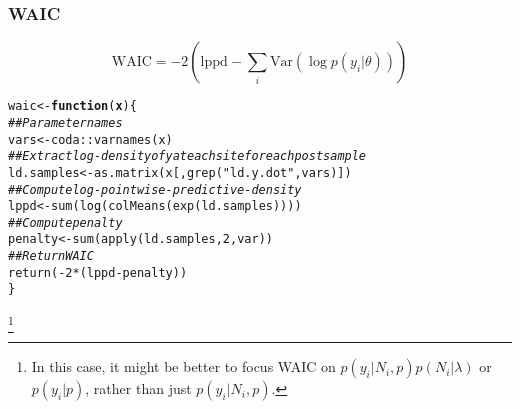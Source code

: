\documentclass[color=usenames,dvipsnames]{beamer}\usepackage[]{graphicx}\usepackage[]{xcolor}
\makeatletter
\newcommand{\hlnum}[1]{\textcolor[rgb]{0.69,0.494,0}{#1}}%
\newcommand{\hlstr}[1]{\textcolor[rgb]{0.749,0.012,0.012}{#1}}%
\newcommand{\hlcom}[1]{\textcolor[rgb]{0.514,0.506,0.514}{\textit{#1}}}%
\newcommand{\hlopt}[1]{\textcolor[rgb]{0,0,0}{#1}}%
\newcommand{\hlstd}[1]{\textcolor[rgb]{0,0,0}{#1}}%
\newcommand{\hlkwa}[1]{\textcolor[rgb]{0,0,0}{\textbf{#1}}}%
\newcommand{\hlkwb}[1]{\textcolor[rgb]{0,0.341,0.682}{#1}}%
\newcommand{\hlkwc}[1]{\textcolor[rgb]{0,0,0}{\textbf{#1}}}%
\newcommand{\hlkwd}[1]{\textcolor[rgb]{0.004,0.004,0.506}{#1}}%
\newenvironment{kframe}{%
 \def\at@end@of@kframe{}%
 \ifinner\ifhmode%
  \def\at@end@of@kframe{\end{minipage}}%
  \begin{minipage}{\columnwidth}%
 \fi\fi%
 \def\FrameCommand##1{\hskip\@totalleftmargin \hskip-\fboxsep
 \colorbox{shadecolor}{##1}\hskip-\fboxsep
     \hskip-\linewidth \hskip-\@totalleftmargin \hskip\columnwidth}%
 \MakeFramed {\advance\hsize-\width
   \@totalleftmargin\z@ \linewidth\hsize
   \@setminipage}}%
 {\par\unskip\endMakeFramed%
 \at@end@of@kframe}
\newenvironment{knitrout}{}{} %
\makeatother
\begin{document}
\bgroup
\let\oldfootnoterule\footnoterule
\def\footnoterule{\only<2->\oldfootnoterule}
\begin{frame}[fragile]
  \frametitle{WAIC}
  \[
    \mathrm{WAIC} = -2\left(\mathrm{lppd} - \sum_i \mathrm{Var}(\log p(y_i|\theta))\right)
  \]

\begin{knitrout}\footnotesize
{}\color{fgcolor}\begin{kframe}
\begin{alltt}
\hlstd{waic} \hlkwb{<-} \hlkwa{function}\hlstd{(}\hlkwc{x}\hlstd{) \{}
    \hlcom{## Parameter names}
    \hlstd{vars} \hlkwb{<-} \hlstd{coda}\hlopt{::}\hlkwd{varnames}\hlstd{(x)}
    \hlcom{## Extract log-density of y at each site for each post sample}
    \hlstd{ld.samples} \hlkwb{<-} \hlkwd{as.matrix}\hlstd{(x[,}\hlkwd{grep}\hlstd{(}\hlstr{"ld.y.dot"}\hlstd{, vars)])}
    \hlcom{## Compute log-pointwise-predictive-density}
    \hlstd{lppd} \hlkwb{<-} \hlkwd{sum}\hlstd{(}\hlkwd{log}\hlstd{(}\hlkwd{colMeans}\hlstd{(}\hlkwd{exp}\hlstd{(ld.samples))))}
    \hlcom{## Compute penalty}
    \hlstd{penalty} \hlkwb{<-} \hlkwd{sum}\hlstd{(}\hlkwd{apply}\hlstd{(ld.samples,} \hlnum{2}\hlstd{, var))}
    \hlcom{## Return WAIC}
    \hlkwd{return}\hlstd{(}\hlopt{-}\hlnum{2}\hlopt{*}\hlstd{(lppd}\hlopt{-}\hlstd{penalty))}
\hlstd{\}}
\end{alltt}
\end{kframe}
\end{knitrout}
\let\thefootnote\relax\footnote<2->{In this case, it might be better to focus WAIC on
$p(y_i|N_i,p)p(N_i|\lambda)$ or $p(y_i|p)$, rather than just $p(y_i|N_i,p)$.} 
\end{frame}
\egroup


\end{document}
